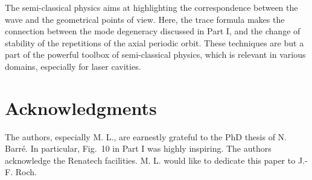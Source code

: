 \documentclass[10pt]{iopart}
\begin{document}
The semi-classical physics aims at highlighting the correspondence between the wave and the geometrical points of view. Here, the trace formula makes the connection between the mode degeneracy discussed in Part I, and the change of stability of the repetitions of the axial periodic orbit. These techniques are but a part of the powerful toolbox of semi-classical physics, which is relevant in various domains, especially for laser cavities.\\


\section*{Acknowledgments}

The authors, especially M. L., are earnestly grateful to the PhD thesis of N. Barr\'e. In particular, Fig.~10 in Part I was highly inspiring. The authors acknowledge the Renatech facilities. M. L. would like to dedicate this paper to J.-F. Roch.\\
\end{document}
